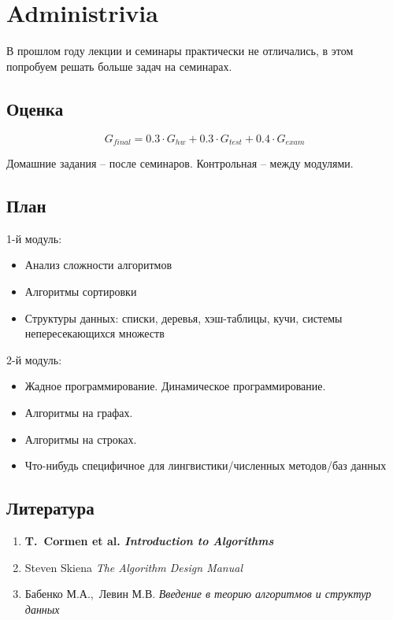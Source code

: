 \documentclass[12pt,a4paper]{report}
\begin{document}

\section{Administrivia}

В прошлом году лекции и семинары практически не отличались, в этом попробуем решать больше задач на семинарах.

\subsection*{Оценка}

$$
G_{final} = 0.3 \cdot G_{hw} + 0.3 \cdot G_{test} + 0.4 \cdot G_{exam}
$$

Домашние задания -- после семинаров. Контрольная -- между модулями.

\subsection*{План}

1-й модуль:

\begin{itemize}
	\item Анализ сложности алгоритмов
	\item Алгоритмы сортировки
	\item Структуры данных: списки, деревья, хэш-таблицы, кучи, системы непересекающихся множеств
\end{itemize}

2-й модуль:

\begin{itemize}
	\item Жадное программирование. Динамическое программирование.
	\item Алгоритмы на графах.
	\item Алгоритмы на строках.
	\item Что-нибудь специфичное для лингвистики/численных методов/баз данных
\end{itemize}

\subsection*{Литература}

\begin{enumerate}
  \item {\bf T.~Cormen et al. {\em Introduction to Algorithms}}
  \item Steven Skiena {\em The Algorithm Design Manual}
  \item Бабенко М.А.,~Левин М.В. {\em Введение в теорию алгоритмов и структур данных}
\end{enumerate}
\end{document}
